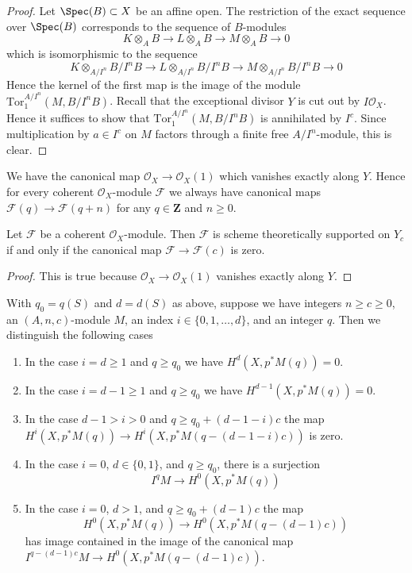 \begin{proof}
Let $\Spec(B) \subset X$ be an affine open. The restriction of the exact
sequence over $\Spec(B)$ corresponds to the sequence of $B$-modules
$$
K \otimes_A B \to L \otimes_A B \to M \otimes_A B \to 0
$$
which is isomorphismic to the sequence
$$
K \otimes_{A/I^n} B/I^nB \to
L \otimes_{A/I^n} B/I^nB \to
M \otimes_{A/I^n} B/I^nB \to 0
$$
Hence the kernel of the first map is the image of the module
$\text{Tor}_1^{A/I^n}(M, B/I^nB)$. Recall that the exceptional
divisor $Y$ is cut out by $I\mathcal{O}_X$. 
Hence it suffices to show that
$\text{Tor}_1^{A/I^n}(M, B/I^nB)$ is annihilated by $I^c$. Since
multiplication by $a \in I^c$ on $M$ factors through a finite
free $A/I^n$-module, this is clear.
\end{proof}

\noindent
We have the canonical map $\mathcal{O}_X \to \mathcal{O}_X(1)$
which vanishes exactly along $Y$.
Hence for every coherent $\mathcal{O}_X$-module $\mathcal{F}$
we always have canonical maps
$\mathcal{F}(q) \to \mathcal{F}(q + n)$ for any $q \in \mathbf{Z}$
and $n \geq 0$.

\begin{lemma}
\label{lemma-annihilated}
Let $\mathcal{F}$ be a coherent $\mathcal{O}_X$-module.
Then $\mathcal{F}$ is scheme theoretically
supported on $Y_c$ if and only if the canonical map
$\mathcal{F} \to \mathcal{F}(c)$ is zero.
\end{lemma}

\begin{proof}
This is true because $\mathcal{O}_X \to \mathcal{O}_X(1)$
vanishes exactly along $Y$.
\end{proof}

\begin{lemma}
\label{lemma-vanishing-coh-almost-projective}
With $q_0 = q(S)$ and $d = d(S)$ as above, suppose we have
integers $n \geq c \geq 0$, an $(A, n, c)$-module $M$,
an index $i \in \{0, 1, \ldots, d\}$, and an integer $q$.
Then we distinguish the following cases
\begin{enumerate}
\item In the case $i = d \geq 1$ and $q \geq q_0$ we have
$H^d(X, p^*M(q)) = 0$.
\item In the case $i = d - 1 \geq 1$ and $q \geq q_0$ we have
$H^{d - 1}(X, p^*M(q)) = 0$.
\item In the case $d - 1 > i > 0$ and $q \geq q_0 + (d - 1 - i)c$
the map
$H^i(X, p^*M(q)) \to H^i(X, p^*M(q - (d - 1 - i)c))$
is zero.
\item In the case $i = 0$, $d \in \{0, 1\}$, and $q \geq q_0$, there
is a surjection
$$
I^qM \longrightarrow H^0(X, p^*M(q))
$$
\item In the case $i = 0$, $d > 1$, and $q \geq q_0 + (d - 1)c$ the map
$$
H^0(X, p^*M(q)) \to H^0(X, p^*M(q - (d - 1)c))
$$
has image contained in the image of the canonical map
$I^{q - (d - 1)c}M \to H^0(X, p^*M(q - (d - 1)c))$.
\end{enumerate}
\end{lemma}

